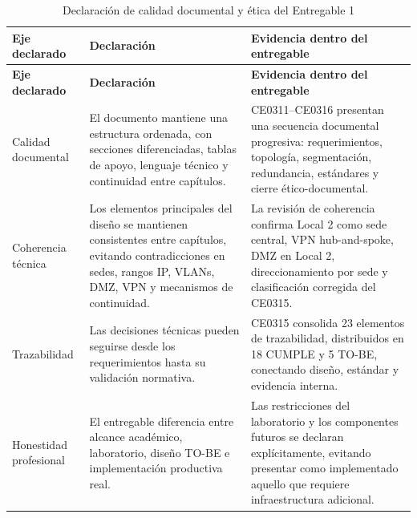 \documentclass[11pt, a4paper, oneside]{report}
\begin{document}
\begin{xltabular}{\textwidth}{@{}|L{3.4cm}|X|X|@{}}
\caption{Declaración de calidad documental y ética del Entregable 1}
\label{tab:declaracion_calidad_documental_etica} \\

\parbox[c][1.1cm][c]{\linewidth}{\centering\color{white}\bfseries\small Eje declarado} &
\parbox[c][1.1cm][c]{\linewidth}{\centering\color{white}\bfseries\small Declaración} &
\parbox[c][1.1cm][c]{\linewidth}{\centering\color{white}\bfseries\small Evidencia dentro del entregable} \\ \hline
\endfirsthead

\parbox[c][1.1cm][c]{\linewidth}{\centering\color{white}\bfseries\small Eje declarado} &
\parbox[c][1.1cm][c]{\linewidth}{\centering\color{white}\bfseries\small Declaración} &
\parbox[c][1.1cm][c]{\linewidth}{\centering\color{white}\bfseries\small Evidencia dentro del entregable} \\ \hline
\endhead

\hline
\endfoot

{\small Calidad documental} &
{\small El documento mantiene una estructura ordenada, con secciones diferenciadas, tablas de apoyo, lenguaje técnico y continuidad entre capítulos.} &
{\small CE0311--CE0316 presentan una secuencia documental progresiva: requerimientos, topología, segmentación, redundancia, estándares y cierre ético-documental.} \\ \hline

{\small Coherencia técnica} &
{\small Los elementos principales del diseño se mantienen consistentes entre capítulos, evitando contradicciones en sedes, rangos IP, VLANs, DMZ, VPN y mecanismos de continuidad.} &
{\small La revisión de coherencia confirma Local 2 como sede central, VPN hub-and-spoke, DMZ en Local 2, direccionamiento por sede y clasificación corregida del CE0315.} \\ \hline

{\small Trazabilidad} &
{\small Las decisiones técnicas pueden seguirse desde los requerimientos hasta su validación normativa.} &
{\small CE0315 consolida 23 elementos de trazabilidad, distribuidos en 18 CUMPLE y 5 TO-BE, conectando diseño, estándar y evidencia interna.} \\ \hline

{\small Honestidad profesional} &
{\small El entregable diferencia entre alcance académico, laboratorio, diseño TO-BE e implementación productiva real.} &
{\small Las restricciones del laboratorio y los componentes futuros se declaran explícitamente, evitando presentar como implementado aquello que requiere infraestructura adicional.} \\ \hline


\end{xltabular}
\end{document}
